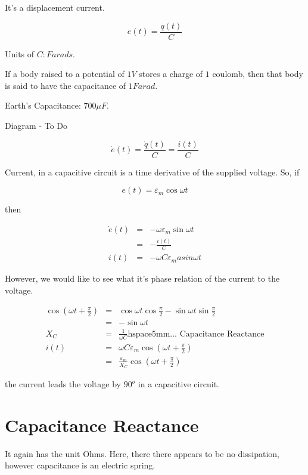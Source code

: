 \documentclass[a4paper,12pt]{article}
\begin{document}
It's a displacement current.

\[ e(t) = \frac{q(t)}{C} \]

Units of $C: Farads$.

If a body raised to a potential of $1V$ stores a charge of $1$ coulomb,
then that body is said to have the capacitance of $1 Farad$.

Earth's Capacitance: $700\mu F$.

\begin{table}[hbtp]

Diagram - To Do

\end{table}

\[ \dot{e}(t) = \frac{\dot{q}(t)}{C} = \frac{i(t)}{C} \]

Current, in a capacitive circuit is a time derivative of the supplied
voltage. So, if

\[ e(t) = \varepsilon_{m} \cos{\omega t} \]

then

\begin{eqnarray*}
\dot{e}(t) & = & - \omega \varepsilon_{m} \sin{\omega t} \\
			  & = & - \frac{i(t)}{C} \\
i(t)		  & = & - \omega C \varepsilon_{m} asin{\omega t}
\end{eqnarray*}

However, we would like to see what it's phase relation of the current to
the voltage.

\begin{eqnarray*}
\cos{(\omega t + \frac{\pi}{2})} & = & \cos{\omega t}
\cos{\frac{\pi}{2}} - \sin{\omega t}{\sin{\frac{\pi}{2}}} \\
& = & - \sin{\omega t} \\
X_{C} & = & \frac{1}{\omega C} \mbox{hspace{5mm}... Capacitance
Reactance} \\
i(t) & = & \omega C \varepsilon_{m} \cos{(\omega t + \frac{\pi}{2})} \\
	  & = & \frac{\varepsilon_{m}}{X_{C}} \cos{(\omega t +
	  \frac{\pi}{2})}
\end{eqnarray*}

the current leads the voltage by $90^{o}$ in a capacitive circuit.

\section{Capacitance Reactance}

It again has the unit Ohms. Here, there there appears to be no
dissipation, however capacitance is an electric spring.
\end{document}
